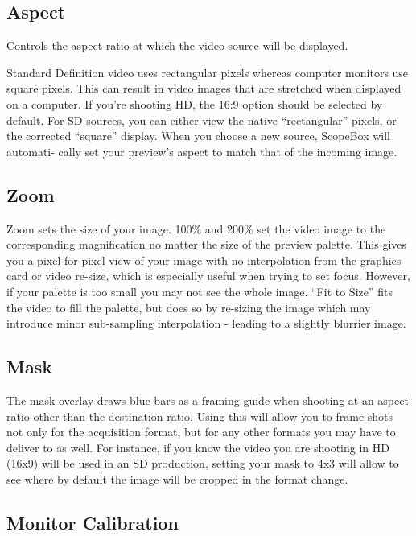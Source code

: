 \documentclass[10,letterpaper,]{report}
\begin{document}
\subsection{Aspect}

Controls the aspect ratio at which the video source will be displayed.

Standard Definition video uses rectangular pixels whereas computer
monitors use square pixels. This can result in video images that are
stretched when displayed on a computer. If you're shooting HD, the 16:9
option should be selected by default. For SD sources, you can either
view the native ``rectangular'' pixels, or the corrected ``square''
display. When you choose a new source, ScopeBox will automati- cally set
your preview's aspect to match that of the incoming image.

\subsection{Zoom}

Zoom sets the size of your image. 100\% and 200\% set the video image to
the corresponding magnification no matter the size of the preview
palette. This gives you a pixel-for-pixel view of your image with no
interpolation from the graphics card or video re-size, which is
especially useful when trying to set focus. However, if your palette is
too small you may not see the whole image. ``Fit to Size'' fits the
video to fill the palette, but does so by re-sizing the image which may
introduce minor sub-sampling interpolation - leading to a slightly
blurrier image.

\subsection{Mask}

The mask overlay draws blue bars as a framing guide when shooting at an
aspect ratio other than the destination ratio. Using this will allow you
to frame shots not only for the acquisition format, but for any other
formats you may have to deliver to as well. For instance, if you know
the video you are shooting in HD (16x9) will be used in an SD
production, setting your mask to 4x3 will allow to see where by default
the image will be cropped in the format change.

\subsection{Monitor Calibration}
\end{document}
